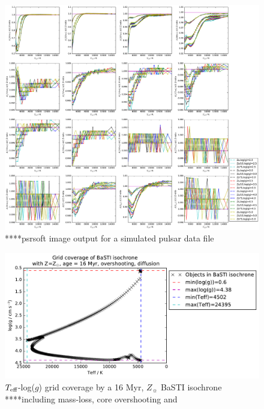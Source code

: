 \documentclass[usenatbib]{mnras}
\begin{document}
\begin{figure}
\begin{center}
\includegraphics[scale=0.3]{../Aall_ratio_Zs_div_Z2_effect_high_logg_zoom_15000.pdf}
\caption{****psrsoft image output for a simulated pulsar data file}
\label{all_Z_Z2_ratio}
\end{center}
\end{figure}

\begin{figure}
\includegraphics[scale=0.4]{../wfc3_16_23Myr_10Gyr_complex_solar/wfc3_ATLAS9_grid_BaSTI_coverage_c16_complex_Zsol_4500.pdf}
\caption{$T_{\textnormal{eff}}$-log($g$) grid coverage by a 16 Myr, $Z_{\sun}$ BaSTI isochrone ****including mass-loss, core overshooting and }
\label{BaSTI_coverage}
\end{figure}

\end{document}
